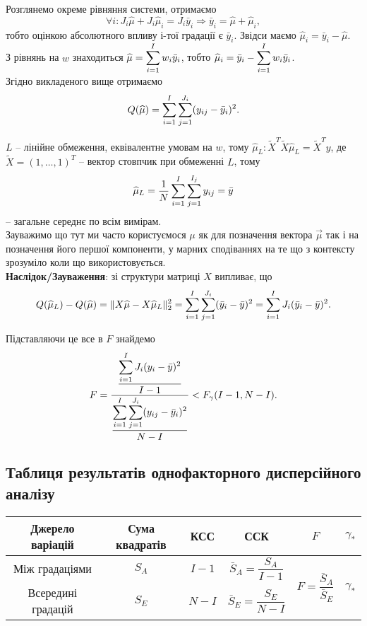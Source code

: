 Розглянемо окреме рівняння системи, отримаємо \[ \forall i: J_i \widehat{\mu} + J_i \widehat{\mu}_i = J_i \bar{y}_i \Rightarrow \bar{y}_i = \widehat{\mu} + \widehat{\mu}_i, \] тобто оцінкою абсолютного впливу $і$-тої градації є $\bar{y}_i$. Звідси маємо $\widehat{\mu}_i = \bar{y}_i - \widehat{\mu}$. \\

З рівнянь на $w$ знаходиться $\widehat{\mu} = \displaystyle\sum\limits_{i=1}^I  w_i\bar{y}_i$, тобто $\widehat{\mu}_i = \bar{y}_i - \displaystyle\sum\limits_{i=1}^I  w_i\bar{y}_i$. \\

Згідно викладеного вище отримаємо \[ Q(\widehat{\mu}) = \displaystyle\sum\limits_{i=1}^I \sum_{j=1}^{J_i} (y_{ij}-\bar{y}_i)^2. \]

$L$ -- лінійне обмеження, еквівалентне умовам на $w$, тому $\widehat{\mu}_L: \widetilde{X}^T\widetilde{X}\widehat{\mu}_L=\widetilde{X}^Ty$, де $\widetilde{X} = (1, \ldots, 1)^T$ -- вектор стовпчик при обмеженні $L$, тому \[\widehat{\mu}_L = \dfrac{1}{N} \displaystyle\sum\limits_{i=1}^I \displaystyle\sum\limits_{j=1}^{I_j} y_{ij} = \bar{y}\] -- загальне середнє по всім вимірам. \\

Зауважимо що тут ми часто користуємося $\mu$ як для позначення вектора $\vec\mu$ так і на позначення його першої компоненти, у марних сподіваннях на те що з контексту зрозуміло коли що використовується. \\

\textbf{Наслідок/Зауваження}: зі структури матриці $X$ випливає, що \[ Q(\widehat{\mu}_L)-Q(\widehat{\mu})=\|X\widehat{\mu}-X\widehat{\mu}_L\|_2^2 = \displaystyle\sum\limits_{i=1}^I\displaystyle\sum\limits_{j=1}^{J_i}(\bar{y}_i-\bar{y})^2 =  \displaystyle\sum\limits_{i=1}^I J_i(\bar{y}_i-\bar{y})^2. \]

Підставляючи це все в $F$ знайдемо \[ F = \dfrac{\dfrac{\displaystyle\sum\limits_{i=1}^IJ_i(y_i-\bar{y})^2}{I-1}}{\dfrac{\displaystyle\sum\limits_{i=1}^I\displaystyle\sum\limits_{j=1}^{J_i}(y_{ij}-\bar{y}_i)^2}{N-I}} < F_\gamma(I-1,N-I). \]

\subsection{Таблиця результатів однофакторного дисперсійного аналізу}

\begin{table}[H]
	\centering
	\begin{tabular}{|c|c|c|c|c|c|}
		\hline
		Джерело варіацій & Сума квадратів & КСС & ССК & $F$ & $\gamma_*$ \\ \hline
		Між градаціями & $S_A$ & $I - 1$ & $\bar{S}_A = \dfrac{S_A}{I - 1}$ & \multirow{2}{*}{$F = \dfrac{\bar{S}_A}{\bar{S}_E}$} & \multirow{2}{*}{$\gamma_*$} \\ \cline{1-4}
		Всередині градацій & $S_E$ & $N - I$ & $\bar{S}_E = \dfrac{S_E}{N - I}$ & & \\ \hline
	\end{tabular}
\end{table}

